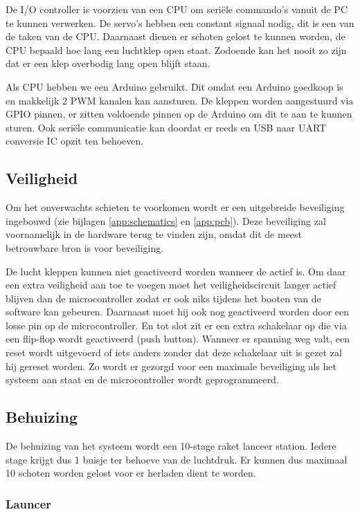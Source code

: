 De I/O controller is voorzien van een CPU om seriële commando’s vanuit de PC te
kunnen verwerken. De servo’s hebben een constant signaal nodig, dit is een van
de taken van de CPU. Daarnaast dienen er schoten gelost te kunnen worden, de
CPU bepaald hoe lang een luchtklep open staat. Zodoende kan het nooit zo zijn
dat er een klep overbodig lang open blijft staan.

Als CPU hebben we een Arduino gebruikt. Dit omdat een Arduino goedkoop is en
makkelijk 2 PWM kanalen kan aansturen. De kleppen worden aangestuurd via GPIO
pinnen, er zitten voldoende pinnen op de Arduino om dit te aan te kunnen sturen.
Ook seriële communicatie kan doordat er reeds en USB naar UART conversie IC
opzit ten behoeven.

\subsection{Veiligheid}

Om het onverwachts schieten te voorkomen wordt er een uitgebreide beveiliging
ingebouwd (zie bijlagen \ref{app:schematics} en \ref{app:pcb}). Deze beveiliging
zal voornamelijk in de hardware terug te vinden zijn, omdat dit de meest
betrouwbare bron is voor beveiliging.

De lucht kleppen kunnen niet geactiveerd worden wanneer de  actief
is. Om daar een extra veiligheid aan toe te voegen moet het veiligheidscircuit
langer actief blijven dan de microcontroller zodat er ook niks tijdens het booten van de
software kan gebeuren. Daarnaast moet hij ook nog geactiveerd worden door een
losse pin op de microcontroller. En tot slot zit er een extra  schakelaar
op die via een flip-flop wordt geactiveerd (push button). Wanneer er spanning
weg valt, een reset wordt uitgevoerd of iets anders zonder dat deze schakelaar
uit is gezet zal hij gereset worden. Zo wordt er gezorgd voor een maximale
beveiliging als het systeem aan staat en de microcontroller wordt geprogrammeerd.

\subsection{Behuizing}

De behuizing van het systeem wordt een 10-stage raket lanceer station. Iedere
stage krijgt dus 1 buisje ter behoeve van de luchtdruk. Er kunnen dus maximaal 10
schoten worden gelost voor er herladen dient te worden.

\subsubsection{Launcer}

